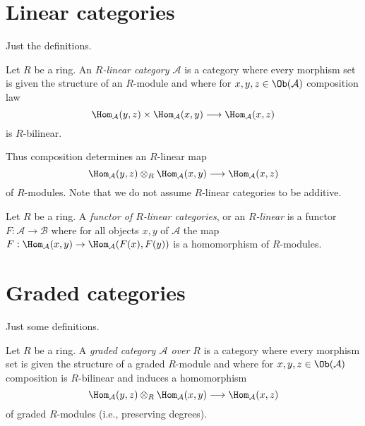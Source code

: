 \section{Linear categories}
\label{section-linear}

\noindent
Just the definitions.

\begin{definition}
\label{definition-linear-category}
Let $R$ be a ring. An {\it $R$-linear category $\mathcal{A}$} is a category
where every morphism set is given the structure of an $R$-module
and where for $x, y, z \in \Ob(\mathcal{A})$ composition law
$$
\Hom_\mathcal{A}(y, z) \times \Hom_\mathcal{A}(x, y)
\longrightarrow
\Hom_\mathcal{A}(x, z)
$$
is $R$-bilinear.
\end{definition}

\noindent
Thus composition determines an $R$-linear map
$$
\Hom_\mathcal{A}(y, z) \otimes_R \Hom_\mathcal{A}(x, y)
\longrightarrow
\Hom_\mathcal{A}(x, z)
$$
of $R$-modules. Note that we do not assume $R$-linear categories to be
additive.

\begin{definition}
\label{definition-functor-linear-categories}
Let $R$ be a ring. A {\it functor of $R$-linear categories}, or an
{\it $R$-linear} is a functor $F : \mathcal{A} \to \mathcal{B}$
where for all objects $x, y$ of $\mathcal{A}$ the map
$F : \Hom_\mathcal{A}(x, y) \to \Hom_\mathcal{A}(F(x), F(y))$
is a homomorphism of $R$-modules.
\end{definition}







\section{Graded categories}
\label{section-graded}

\noindent
Just some definitions.

\begin{definition}
\label{definition-graded-category}
Let $R$ be a ring. A {\it graded category $\mathcal{A}$
over $R$} is a category where every morphism set is given the structure
of a graded $R$-module and where for
$x, y, z \in \Ob(\mathcal{A})$ composition is $R$-bilinear and induces
a homomorphism
$$
\Hom_\mathcal{A}(y, z) \otimes_R \Hom_\mathcal{A}(x, y)
\longrightarrow
\Hom_\mathcal{A}(x, z)
$$
of graded $R$-modules (i.e., preserving degrees).
\end{definition}

